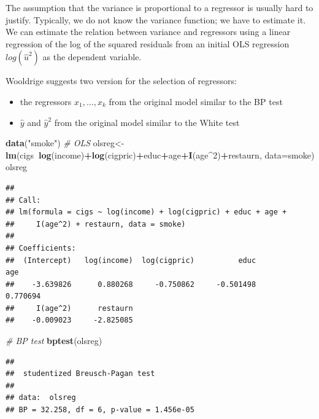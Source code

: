 \documentclass[]{book}
\newenvironment{Shaded}{\begin{snugshade}}{\end{snugshade}}
\newcommand{\CommentTok}[1]{\textcolor[rgb]{0.56,0.35,0.01}{\textit{#1}}}
\newcommand{\DataTypeTok}[1]{\textcolor[rgb]{0.13,0.29,0.53}{#1}}
\newcommand{\DecValTok}[1]{\textcolor[rgb]{0.00,0.00,0.81}{#1}}
\newcommand{\KeywordTok}[1]{\textcolor[rgb]{0.13,0.29,0.53}{\textbf{#1}}}
\newcommand{\NormalTok}[1]{#1}
\newcommand{\OperatorTok}[1]{\textcolor[rgb]{0.81,0.36,0.00}{\textbf{#1}}}
\newcommand{\StringTok}[1]{\textcolor[rgb]{0.31,0.60,0.02}{#1}}
\providecommand{\tightlist}{%
  \setlength{\itemsep}{0pt}\setlength{\parskip}{0pt}}
\begin{document}
The assumption that the variance is proportional to a regressor is usually hard to justify. Typically, we do not know the variance function; we have to estimate it. We can estimate the relation between variance and regressors using a linear regression of the log of the squared residuals from an initial OLS regression \(log(\hat{u}^{2})\) as the dependent variable.

Wooldrige suggests two version for the selection of regressors:

\begin{itemize}
\tightlist
\item
  the regressors \(x_1, \dots , x_k\) from the original model similar to the BP test
\item
  \(\hat{y}\) and \(\hat{y}^{2}\) from the original model similar to the White test
\end{itemize}

\begin{Shaded}
\begin{Highlighting}[]
\KeywordTok{data}\NormalTok{(}\StringTok{"smoke"}\NormalTok{)}
\CommentTok{# OLS}
\NormalTok{olsreg<-}\KeywordTok{lm}\NormalTok{(cigs}\OperatorTok{~}\KeywordTok{log}\NormalTok{(income)}\OperatorTok{+}\KeywordTok{log}\NormalTok{(cigpric)}\OperatorTok{+}\NormalTok{educ}\OperatorTok{+}\NormalTok{age}\OperatorTok{+}\KeywordTok{I}\NormalTok{(age}\OperatorTok{^}\DecValTok{2}\NormalTok{)}\OperatorTok{+}\NormalTok{restaurn, }
           \DataTypeTok{data=}\NormalTok{smoke)}
\NormalTok{olsreg}
\end{Highlighting}
\end{Shaded}

\begin{verbatim}
## 
## Call:
## lm(formula = cigs ~ log(income) + log(cigpric) + educ + age + 
##     I(age^2) + restaurn, data = smoke)
## 
## Coefficients:
##  (Intercept)   log(income)  log(cigpric)          educ           age  
##    -3.639826      0.880268     -0.750862     -0.501498      0.770694  
##     I(age^2)      restaurn  
##    -0.009023     -2.825085
\end{verbatim}

\begin{Shaded}
\begin{Highlighting}[]
\CommentTok{# BP test}
\KeywordTok{bptest}\NormalTok{(olsreg)}
\end{Highlighting}
\end{Shaded}

\begin{verbatim}
## 
##  studentized Breusch-Pagan test
## 
## data:  olsreg
## BP = 32.258, df = 6, p-value = 1.456e-05
\end{verbatim}
\end{document}
